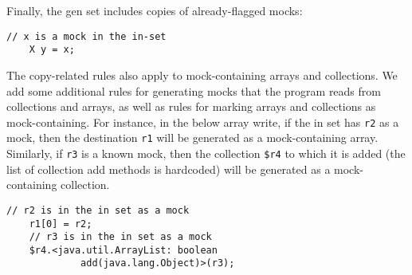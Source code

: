 Finally, the gen set includes copies of already-flagged mocks:
\begin{lstlisting}[basicstyle=\ttfamily\small,numbers=none]
    // x is a mock in the in-set
    X y = x;
\end{lstlisting}
The copy-related rules also apply to mock-containing arrays and collections. We add some additional rules for generating mocks that the program reads from collections and arrays, as well as rules for marking arrays and collections as mock-containing. For instance, in the below array write, if the in set has \texttt{r2} as a mock, then the destination \texttt{r1} will be generated as a mock-containing array. Similarly, if \texttt{r3} is a known mock, then the collection \texttt{\$r4} to which it is added (the list of collection add methods is hardcoded) will be generated as a mock-containing collection.
\begin{lstlisting}[basicstyle=\ttfamily\small,numbers=none]
    // r2 is in the in set as a mock
    r1[0] = r2;
    // r3 is in the in set as a mock
    $r4.<java.util.ArrayList: boolean
             add(java.lang.Object)>(r3);
\end{lstlisting}





